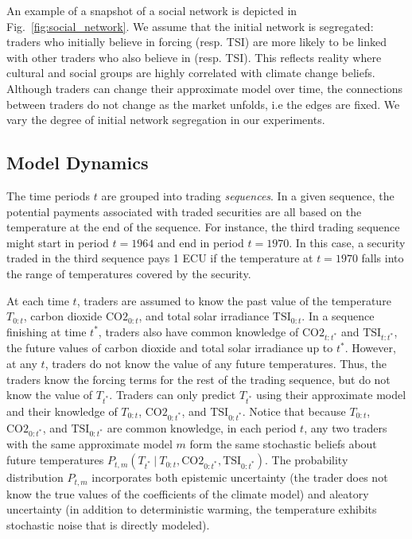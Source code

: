 \documentclass{wscpaperproc}\usepackage[]{graphicx}\usepackage[]{color}
\begin{document}
An example of a snapshot of a social network is depicted in Fig.~\ref{fig:social_network}. 
We assume that the initial network is segregated: traders who initially believe in  forcing (resp. TSI) are more likely to be linked with other traders who also believe in  (resp. TSI).
This reflects reality where cultural and social groups are highly correlated with climate change beliefs. 
Although traders can change their approximate model over time, the connections between traders do not change as the market unfolds, i.e the edges are fixed. We vary the degree of initial network segregation in our experiments.

\subsection{Model Dynamics}

The time periods $t$ are grouped into trading \emph{sequences\/}. 
In a given sequence, the potential payments associated with traded securities are all based on the temperature at the end of the sequence. 
For instance, the third trading sequence might start in period $t = 1964$ and end in period $t = 1970$. 
In this case, a security traded in the third sequence pays 1 ECU if the temperature at $t = 1970$ falls into the range of temperatures covered by the security. 

At each time $t$, traders are assumed to know the past value of the temperature ${T}_{0:t}$, carbon dioxide $\text{CO2}_{0:t}$, and total solar irradiance $\text{TSI}_{0:t}$. 
In a sequence finishing at time $t^*$, traders also have common knowledge of $\text{CO2}_{t:t^*}$ and $\text{TSI}_{t:t^*}$, the future values of carbon dioxide and total solar irradiance up to $t^*$.
However, at any $t$, traders do not know the value of any future temperatures. 
Thus, the traders know the forcing terms for the rest of the trading sequence, but do not know the value of ${T}_{t^*}$. 
Traders can only predict ${T}_{t^*}$ using their approximate model and their knowledge of ${T}_{0:t}$, $\text{CO2}_{0:t^*}$, and $\text{TSI}_{0:t^*}$.
Notice that because ${T}_{0:t}$, $\text{CO2}_{0:t^*}$, and $\text{TSI}_{0:t^*}$ are common knowledge, in each period $t$, any two traders with the same approximate model $m$ form the same stochastic beliefs about future temperatures $P_{t,m}({T}_{t^*} ~|~ {T}_{0:t}, \text{CO2}_{0:t^*}, \text{TSI}_{0:t^*})$.
The probability distribution $P_{t,m}$ incorporates both epistemic uncertainty (the trader does not know the true values of the coefficients of the climate model) and aleatory uncertainty (in addition to deterministic warming, the temperature exhibits stochastic noise that is directly modeled).
     
\end{document}
